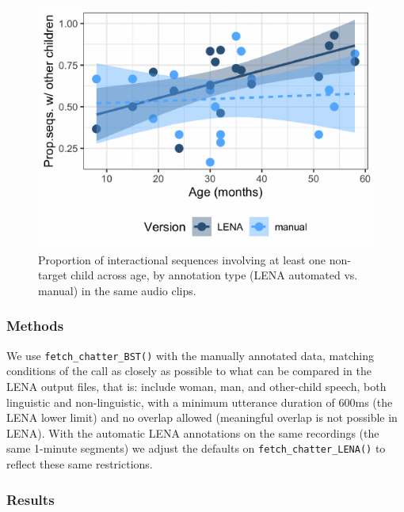 \documentclass[10pt, letterpaper]{article}
\newenvironment{CodeChunk}{}{}
\begin{document}
\begin{CodeChunk}
\begin{figure}[h!]

{\centering \includegraphics{figs/tsi.is.fig-1} 

}

\caption[Proportion of interactional sequences involving at least one non-target child across age, by annotation type (LENA automated vs]{Proportion of interactional sequences involving at least one non-target child across age, by annotation type (LENA automated vs. manual) in the same audio clips.}\label{fig:tsi.is.fig}
\end{figure}
\end{CodeChunk}

\hypertarget{methods-1}{%
\subsubsection{Methods}\label{methods-1}}

We use \texttt{fetch\_chatter\_BST()} with the manually annotated data,
matching conditions of the call as closely as possible to what can be
compared in the LENA output files, that is: include woman, man, and
other-child speech, both linguistic and non-linguistic, with a minimum
utterance duration of 600ms (the LENA lower limit) and no overlap
allowed (meaningful overlap is not possible in LENA). With the automatic
LENA annotations on the same recordings (the same 1-minute segments) we
adjust the defaults on \texttt{fetch\_chatter\_LENA()} to reflect these
same restrictions.

\hypertarget{results-1}{%
\subsubsection{Results}\label{results-1}}
\end{document}
